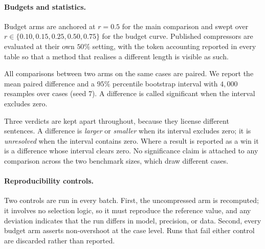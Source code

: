 \paragraph{Budgets and statistics.}
Budget arms are anchored at $r=0.5$ for the main comparison and swept over
$r\in\{0.10,0.15,0.25,0.50,0.75\}$ for the budget curve. Published compressors are
evaluated at their own $50\%$ setting, with the token accounting reported in every table so
that a method that realises a different length is visible as such.

All comparisons between two arms on the same cases are paired. We report the mean paired
difference and a $95\%$ percentile bootstrap interval with $4{,}000$ resamples over cases
(seed 7). A difference is called significant when the interval excludes zero.

Three verdicts are kept apart throughout, because they license different sentences. A
difference is \emph{larger} or \emph{smaller} when its interval excludes zero; it is
\emph{unresolved} when the interval contains zero. Where a result is reported as a win it is a
difference whose interval clears zero. No significance claim is attached to any comparison across
the two benchmark sizes, which draw different cases.

\paragraph{Reproducibility controls.}
Two controls are run in every batch. First, the uncompressed arm is recomputed; it involves
no selection logic, so it must reproduce the reference value, and any deviation indicates
that the run differs in model, precision, or data. Second, every budget arm asserts
non-overshoot at the case level. Runs that fail either control are discarded rather than
reported.
